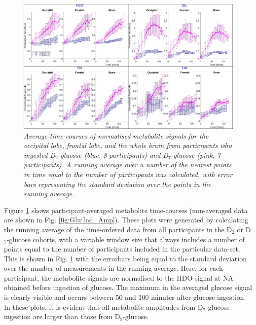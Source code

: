 \begin{figure}
    \centering
    \includegraphics[width = 1\textwidth]{Figures/Glucose/Avg_Amp.png}
    \caption{\textit{Average time-courses of normalised metabolite signals for the occipital lobe, frontal lobe, and the whole brain from participants who ingested D$_2$-glucose (blue, 8 participants) and D$_7$-glucose (pink, 7 participants). A running average over a number of the nearest points in time equal to the number of participants was calculated, with error bars representing the standard deviation over the points in the running average.}}
    \label{fig:Glu:Avg_Amp}
\end{figure}

Figure \ref{fig:Glu:Avg_Amp} shows participant-averaged metabolite time-courses (non-averaged data are shown in Fig. \ref{fig:Glu:Ind_Amp}). These plots were generated by calculating the running average of the time-ordered data from all participants in the D$_2$ or D$_7$-glucose cohorts, with a variable window size that always includes a number of points equal to the number of participants included in the particular data-set. This is shown in Fig. \ref{fig:Glu:Avg_Amp} with the errorbars being equal to the standard deviation over the number of measurements in the running average. Here, for each participant, the metabolite signals are normalised to the \ac{HDO} signal at \ac{NA} obtained before ingestion of glucose. The maximum in the averaged glucose signal is clearly visible and occurs between 50 and 100 minutes after glucose ingestion. In these plots, it is evident that all metabolite amplitudes from D$_7$-glucose ingestion are larger than those from D$_2$-glucose. 

